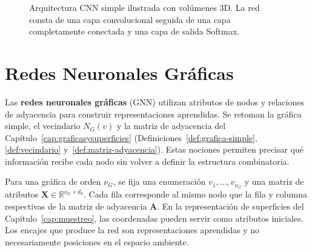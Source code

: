 \begin{figure}[ht]
\caption{Arquitectura CNN simple ilustrada con volúmenes 3D. La red consta de una capa convolucional seguida de una capa completamente conectada y una capa de salida Softmax.}
\label{fig:cnn-3d-simple-clean}
\end{figure}



\section{Redes Neuronales Gráficas}

Las \textbf{redes neuronales gráficas} (GNN) utilizan atributos de nodos y relaciones de adyacencia para construir representaciones aprendidas. Se retoman la gráfica simple, el vecindario $N_G(v)$ y la matriz de adyacencia del Capítulo~\ref{cap:graficasysuperficies} (Definiciones~\ref{def:grafica-simple}, \ref{def:vecindario} y~\ref{def:matriz-adyacencia}). Estas nociones permiten precisar qué información recibe cada nodo sin volver a definir la estructura combinatoria.

Para una gráfica de orden $\nu_G$, se fija una enumeración $v_1,\ldots,v_{\nu_G}$ y una matriz de atributos $\mathbf X\in\mathbb R^{\nu_G\times d_0}$. Cada fila corresponde al mismo nodo que la fila y columna respectivas de la matriz de adyacencia $\mathbf A$. En la representación de superficies del Capítulo~\ref{cap:muestreo}, las coordenadas pueden servir como atributos iniciales. Los encajes que produce la red son representaciones aprendidas y no necesariamente posiciones en el espacio ambiente.

